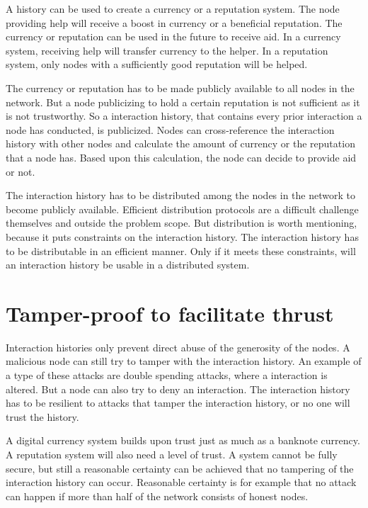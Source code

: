 A history can be used to create a currency or a reputation system.
The node providing help will receive a boost in currency or a beneficial reputation.
The currency or reputation can be used in the future to receive aid.
In a currency system, receiving help will transfer currency to the helper.
In a reputation system, only nodes with a sufficiently good reputation will be helped.

The currency or reputation has to be made publicly available to all nodes in the network.
But a node publicizing to hold a certain reputation is not sufficient as it is not trustworthy.
So a interaction history, that contains every prior interaction a node has conducted, is publicized.
Nodes can cross-reference the interaction history with other nodes and calculate the amount of currency 
or the reputation that a node has.
Based upon this calculation, the node can decide to provide aid or not.

The interaction history has to be distributed among the nodes in the network
to become publicly available.
Efficient distribution protocols are a difficult challenge themselves and outside the problem scope.
But distribution is worth mentioning, because it puts constraints on the interaction history.
The interaction history has to be distributable in an efficient manner.
Only if it meets these constraints, will an interaction history be usable in a distributed system.

\section{Tamper-proof to facilitate thrust}

Interaction histories only prevent direct abuse of the generosity of the nodes.
A malicious node can still try to tamper with the interaction history.
An example of a type of these attacks are double spending attacks\cite{Nakamoto-bitcoin},
where a interaction is altered.
But a node can also try to deny an interaction.
The interaction history has to be resilient to attacks that tamper the interaction history, 
or no one will trust the history.

A digital currency system builds upon trust just as much as a banknote currency.
A reputation system will also need a level of trust.
A system cannot be fully secure, 
but still a reasonable certainty can be achieved that no tampering of the interaction history can occur.
Reasonable certainty is for example that no attack can happen 
if more than half of the network consists of honest nodes.

